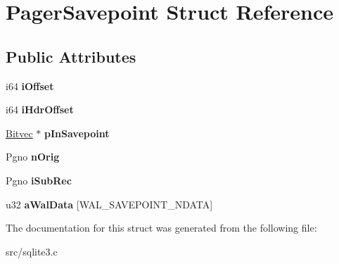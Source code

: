 \hypertarget{struct_pager_savepoint}{\section{Pager\-Savepoint Struct Reference}
\label{struct_pager_savepoint}
}
\subsection*{Public Attributes}
\begin{DoxyCompactItemize}
\item 
\hypertarget{struct_pager_savepoint_ab3ee7b75a10f47a82c8e3312bee6ad60}{i64 {\bfseries i\-Offset}}\label{struct_pager_savepoint_ab3ee7b75a10f47a82c8e3312bee6ad60}

\item 
\hypertarget{struct_pager_savepoint_ae1afd1cf4fba6f7efd232656366121d1}{i64 {\bfseries i\-Hdr\-Offset}}\label{struct_pager_savepoint_ae1afd1cf4fba6f7efd232656366121d1}

\item 
\hypertarget{struct_pager_savepoint_abf7d6dc9d457c866727f84c4b9e0348f}{\hyperlink{struct_bitvec}{Bitvec} $\ast$ {\bfseries p\-In\-Savepoint}}\label{struct_pager_savepoint_abf7d6dc9d457c866727f84c4b9e0348f}

\item 
\hypertarget{struct_pager_savepoint_a944cca2844a51bdba253476f516b9865}{Pgno {\bfseries n\-Orig}}\label{struct_pager_savepoint_a944cca2844a51bdba253476f516b9865}

\item 
\hypertarget{struct_pager_savepoint_ac1accce313b9da31631892e2cbe85a2f}{Pgno {\bfseries i\-Sub\-Rec}}\label{struct_pager_savepoint_ac1accce313b9da31631892e2cbe85a2f}

\item 
\hypertarget{struct_pager_savepoint_ac96cff844a24378c426a9901517f1d6c}{u32 {\bfseries a\-Wal\-Data} \mbox{[}W\-A\-L\-\_\-\-S\-A\-V\-E\-P\-O\-I\-N\-T\-\_\-\-N\-D\-A\-T\-A\mbox{]}}\label{struct_pager_savepoint_ac96cff844a24378c426a9901517f1d6c}

\end{DoxyCompactItemize}


The documentation for this struct was generated from the following file\-:\begin{DoxyCompactItemize}
\item 
src/sqlite3.\-c\end{DoxyCompactItemize}
